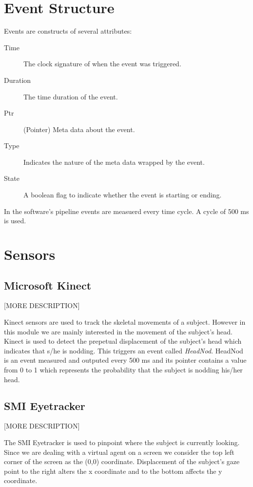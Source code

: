 \documentclass[12pt, a4paper, fleqn]{memoir}%
\begin{document}
\section{Event Structure}
Events are constructs of several attributes:

\begin{description}
  \item[Time] The clock signature of when the event was triggered.
  \item[Duration] The time duration of the event.
  \item[Ptr] (Pointer) Meta data about the event.
  \item[Type] Indicates the nature of the meta data wrapped by the event.
  \item[State] A boolean flag to indicate whether the event is starting or ending.
\end{description}

In the software's pipeline events are measuerd every time cycle. A cycle of 500 ms is used.

\section{Sensors}
\label{sec:Sensors}

\subsection{Microsoft Kinect}
[MORE DESCRIPTION]

Kinect sensors are used to track the skeletal movements of a subject. However in this module we are mainly interested in the movement of the subject's head. Kinect is used to detect the prepetual displacement of the subject's head which indicates that s/he is nodding. This triggers an event called \textit{HeadNod}. HeadNod is an event measured and outputed every 500 ms and its pointer contains a value from 0 to 1 which represents the probability that the subject is nodding his/her head.

\subsection{SMI Eyetracker}
[MORE DESCRIPTION]

The SMI Eyetracker is used to pinpoint where the subject is currently looking. Since we are dealing with a virtual agent on a screen we consider the top left corner of the screen as the (0,0) coordinate. Displacement of the subject's gaze point to the right alters the x coordinate and to the bottom affects the y coordinate.
\end{document}
